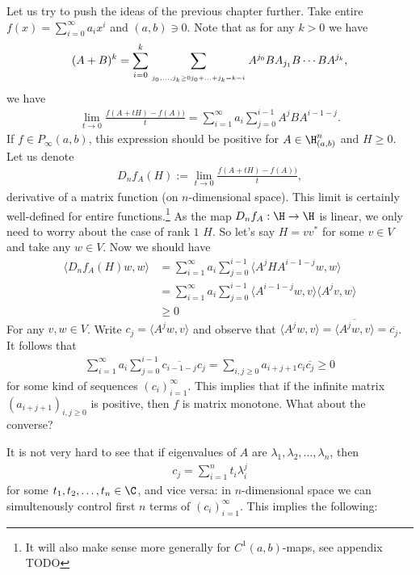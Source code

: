Let us try to push the ideas of the previous chapter further. Take entire $f(x) = \sum_{i = 0}^{\infty} a_{i} x^{i}$ and $(a, b) \ni 0$. Note that as for any $k > 0$ we have
\begin{align*}
	(A + B)^k = \sum_{i = 0}^{k} \sum_{\atop{j_{0}, \ldots, j_{k} \geq 0}{j_{0} + \ldots + j_{k} = k - i}} A^{j_{0}} B A_{j_{1}} B \cdots B A^{j_{k}},
\end{align*}
we have
\begin{align*}
	\lim_{t \to 0} \frac{f(A + t H) - f(A))}{t} = \sum_{i = 1}^{\infty} a_{i} \sum_{j = 0}^{i - 1} A^{j} B A^{i - 1 - j}.
\end{align*}
If $f \in P_{\infty}(a, b)$, this expression should be positive for $A \in \H^{n}_{(a, b)}$ and $H \geq 0$. Let us denote
\begin{align*}
	D_{n} f_{A}(H) := \lim_{t \to 0} \frac{f(A + t H) - f(A))}{t},
\end{align*}
derivative of a matrix function (on $n$-dimensional space). This limit is certainly well-defined for entire functions.\footnote{It will also make sense more generally for $C^{1}(a, b)$-maps, see appendix TODO} As the map $D_{n} f_{A} : \H \to \H$ is linear, we only need to worry about the case of rank $1$ $H$. So let's say $H = v v^{*}$ for some $v \in V$ and take any $w \in V$. Now we should have
\begin{align*}
	\langle D_{n} f_{A}(H) w, w \rangle &= \sum_{i = 1}^{\infty} a_{i} \sum_{j = 0}^{i - 1} \langle A^{j} H A^{i - 1 - j} w, w \rangle \\
	&= \sum_{i = 1}^{\infty} a_{i} \sum_{j = 0}^{i - 1} \langle  A^{i - 1 - j} w, v \rangle \langle A^{j} v, w \rangle \\
	&\geq 0
\end{align*}
For any $v, w \in V$. Write $c_{j} = \langle A^{j} w, v \rangle$ and observe that $\langle  A^{j} w, v \rangle = \overline{\langle A^{j} w, v \rangle} = \overline{c_{j}}$. It follows that
\begin{align*}
	\sum_{i = 1}^{\infty} a_{i} \sum_{j = 0}^{i - 1} \overline{c_{i - 1 - j}} c_{j} = \sum_{i, j \geq 0} a_{i + j + 1} c_{i} \overline{c_{j}} \geq 0
\end{align*}
for some kind of sequences $(c_{i})_{i = 1}^{\infty}$. This implies that if the infinite matrix $(a_{i + j + 1})_{i, j \geq 0}$ is positive, then $f$ is matrix monotone. What about the converse?

It is not very hard to see that if eigenvalues of $A$ are $\lambda_{1}, \lambda_{2}, \ldots, \lambda_{n}$, then
\begin{align*}
c_{j} = \sum_{i = 1}^{n} t_{i} \lambda_{i}^{j}
\end{align*}
for some $t_{1}, t_{2}, \ldots, t_{n} \in \C$, and vice versa: in $n$-dimensional space we can simultenously control first $n$ terms of $(c_{i})_{i = 1}^{\infty}$. This implies the following:

